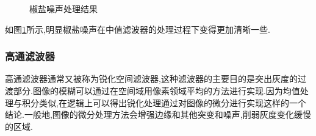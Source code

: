 \documentclass[UTF8,a4paper,10pt]{ctexart}
\begin{document}
\begin{flushleft}
        \begin{figure}[htbp]
            \centering
            \quad
            \caption{椒盐噪声处理结果}
            \label{fig:fig_gray_salt_filter}
        \end{figure}
        \hspace{2em}如图\ref{fig:fig_gray_salt_filter}所示,明显椒盐噪声在中值滤波器的处理过程下变得更加清晰一些.
        \subsubsection{高通滤波器}
        \hspace{2em}高通滤波器通常又被称为锐化空间滤波器,这种滤波器的主要目的是突出灰度的过渡部分.图像的模糊可以通过在空间域用像素领域平均的方法进行实现.因为均值处理与积分类似,在逻辑上可以得出锐化处理通过对图像的微分进行实现这样的一个结论.一般地,图像的微分处理方法会增强边缘和其他突变和噪声,削弱灰度变化缓慢的区域.\\

\end{flushleft}
\end{document}
